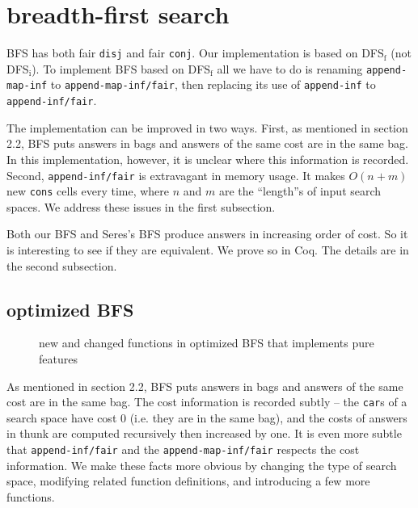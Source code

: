 \documentclass[format=acmlarge, review=true, authordraft=true]{acmart}
\newcommand{\conj}{\texttt{conj}}
\newcommand{\disj}{\texttt{disj}}
\newcommand{\DFSf}[0]{DFS$_\textrm{f}$}
\newcommand{\BFS }[0]{BFS}
\begin{document}
\section{breadth-first search}

BFS has both fair \disj{} and fair \conj{}. Our implementation is based on 
DFS$_\textrm{f}$ (not DFS$_\textrm{i}$). To implement \BFS{} based on \DFSf{} 
all we have to do is renaming 
\texttt{append-map-inf} to \texttt{append-map-inf/fair}, then replacing its use 
of \texttt{append-inf} to \texttt{append-inf/fair}. 

The implementation can be improved in two ways. First, as mentioned in 
section 2.2, BFS puts answers in bags and answers of the same cost are in the 
same bag. In this implementation, however, it is unclear where this information 
is recorded. Second, 
\texttt{append-inf/fair} is extravagant in memory usage. It makes 
$O(n+m)$ new \texttt{cons} cells every time, where $n$ and $m$ are the 
``length''s of input search spaces. We address these issues in the first 
subsection.

Both our BFS and Seres's BFS \citet{seres1999algebra} produce answers in 
increasing order of cost. So it is interesting to see if they are equivalent. 
We prove so in Coq. The details are in the second subsection.

\subsection{optimized BFS}

\begin{figure}
		
	\caption{new and changed functions in optimized BFS that implements pure 
	features}
	\label{BFS-opt}
\end{figure}


As mentioned in section 2.2, BFS puts answers in bags and answers of the 
same cost are in the same bag. The cost
information is recorded subtly -- the \texttt{car}s of a search space have cost 
0 (i.e. they are in the same bag), and the costs of answers in thunk are 
computed recursively then increased by one. It is even more subtle that
\texttt{append-inf/fair} and the \texttt{append-map-inf/fair} respects the cost 
information. We make these facts more obvious by changing the type of search 
space, modifying related function definitions, and introducing a few more 
functions.
\end{document}
